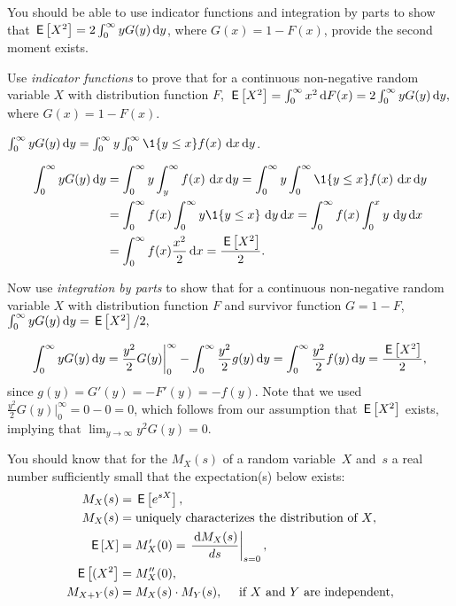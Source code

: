 You should be able to use indicator functions and integration by parts to show that $\,\mathsf{E}\left[X^2\right] = 2\int_0^\infty y G(y) \,\text{d}y$, where $G(x) = 1- F(x)$, provide the second moment exists.

\begin{exercise}%
 Use \emph{indicator functions} to prove that for a continuous non-negative random
    variable $X$ with distribution function $F$, 
$    \,\mathsf{E}\left[X^2\right] = \int_0^\infty x^2 \,\text{d}F(x)  = 2 \int_0^\infty y G(y) \,\text{d}y,$
where $G(x) = 1 - F(x)$. 
\begin{hint}
$\int_0^\infty y G(y) \d y = \int_0^\infty y \int_0^\infty \1{y\leq x}f(x)\, \d x \d y$.
\end{hint}
\begin{solution}
  \begin{align*}
\int_0^\infty y G(y) \d y 
&=  \int_0^\infty y \int_y^\infty f(x)\, \d x \d y =  \int_0^\infty y \int_0^\infty \1{y\leq x}f(x)\, \d x \d y\\
&=  \int_0^\infty f(x) \int_0^\infty y \1{y \leq x}\, \d y \d x
=  \int_0^\infty f(x) \int_0^x y\, \d y \d x\\
&=  \int_0^\infty f(x) \frac{x^2}2 \d x =\frac{\E{X^2}}2.
  \end{align*}
\end{solution}
\end{exercise}

\begin{exercise}%
 Now use \emph{integration by parts} to show that for a continuous non-negative random
    variable $X$ with distribution function $F$ and survivor function $G=1-F$, 
$\int_0^\infty y G(y) \,\text{d}y = \,\mathsf{E}\left[X^2\right]/2,$
\begin{solution}
  \begin{equation}
      \int_0^\infty y G(y) \,\text{d}y 
= \frac{y^2}2 G(y) \bigg|_0^\infty  - \int_0^\infty \frac{y^2}2 g(y)\,\text{d}y = \int_0^\infty \frac{y^2}2 f(y)\,\text{d}y = \frac{\,\mathsf{E}\left[X^2\right]}2,
  \end{equation}
  since $g(y) = G'(y) = - F'(y) = - f(y)$. Note that we used $\frac{y^2}2 G(y) \bigg|_0^\infty = 0 - 0 = 0$, which follows from our assumption that $\,\mathsf{E}\left[X^2\right]$ exists, implying that $\lim_{y \to \infty} y^2G(y) = 0$.
\end{solution}
\end{exercise}


You should know that for  the   $M_X(s)$ of a random variable~$X$ and~$s$ a real number sufficiently small  that the expectation(s) below exists: 
\begin{subequations}
\begin{align}
  M_X(s) &= \,\mathsf{E}\left[e^{s X}\right], \\
  M_X(s) &= \text{uniquely characterizes the distribution of $X$}, \label{eq:75}\\
  \,\mathsf{E}\left[X\right] &= M_{X}'(0) = \left.\frac{\,\text{d}M_{X}(s)}{d s}\right|_{s=0},\label{eq:69}\\
\,\mathsf{E}\left[(X^2\right] &= M_{X}''(0), \label{eq:64}\\
M_{X+Y}(s) &= M_X(s)\cdot M_Y(s), \quad \text{  if $X$ and $Y$ are independent}, \label{eq:73}
\end{align}
\end{subequations}

